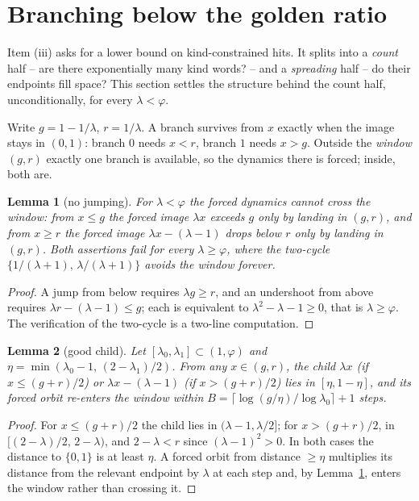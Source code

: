 \documentclass[11pt]{amsart}
\newtheorem{lemma}{Lemma}\newtheorem{proposition}[lemma]{Proposition}
\theoremstyle{remark}\newtheorem{remark}[lemma]{Remark}
\begin{document}
\section{Branching below the golden ratio}

Item (iii) asks for a lower bound on kind-constrained hits. It splits into a
\emph{count} half -- are there exponentially many kind words? -- and a
\emph{spreading} half -- do their endpoints fill space? This section settles
the structure behind the count half, unconditionally, for every
$\lambda<\varphi$.

Write $g=1-1/\lambda$, $r=1/\lambda$. A branch survives from $x$ exactly when
the image stays in $(0,1)$: branch $0$ needs $x<r$, branch $1$ needs $x>g$.
Outside the \emph{window} $(g,r)$ exactly one branch is available, so the
dynamics there is forced; inside, both are.

\begin{lemma}[no jumping]\label{lem:nojump}
For $\lambda<\varphi$ the forced dynamics cannot cross the window: from
$x\leq g$ the forced image $\lambda x$ exceeds $g$ only by landing in $(g,r)$,
and from $x\geq r$ the forced image $\lambda x-(\lambda-1)$ drops below $r$
only by landing in $(g,r)$. Both assertions fail for every
$\lambda\geq\varphi$, where the two-cycle
$\{1/(\lambda+1),\,\lambda/(\lambda+1)\}$ avoids the window forever.
\end{lemma}

\begin{proof}
A jump from below requires $\lambda g\geq r$, and an undershoot from above
requires $\lambda r-(\lambda-1)\leq g$; each is equivalent to
$\lambda^2-\lambda-1\geq0$, that is $\lambda\geq\varphi$. The verification of
the two-cycle is a two-line computation.
\end{proof}

\begin{lemma}[good child]\label{lem:goodchild}
Let $[\lambda_0,\lambda_1]\subset(1,\varphi)$ and
$\eta=\min(\lambda_0-1,\,(2-\lambda_1)/2)$. From any $x\in(g,r)$, the child
$\lambda x$ (if $x\leq(g+r)/2$) or $\lambda x-(\lambda-1)$ (if $x>(g+r)/2$)
lies in $[\eta,1-\eta]$, and its forced orbit re-enters the window within
$B=\lceil\log(g/\eta)/\log\lambda_0\rceil+1$ steps.
\end{lemma}

\begin{proof}
For $x\leq(g+r)/2$ the child lies in $(\lambda-1,\lambda/2]$; for
$x>(g+r)/2$, in $[(2-\lambda)/2,\,2-\lambda)$, and $2-\lambda<r$ since
$(\lambda-1)^2>0$. In both cases the distance to $\{0,1\}$ is at least $\eta$.
A forced orbit from distance $\geq\eta$ multiplies its distance from the
relevant endpoint by $\lambda$ at each step and, by Lemma~\ref{lem:nojump},
enters the window rather than crossing it.
\end{proof}
\end{document}
